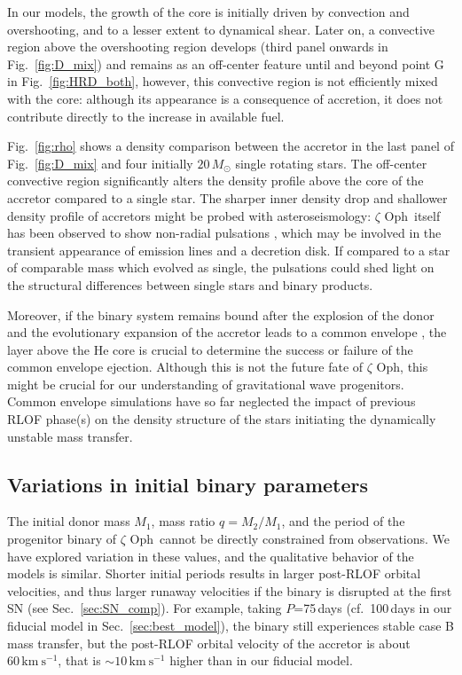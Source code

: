 \documentclass[twocolumn,twocolappendix,trackchanges]{aastex63}
\newcommand{\kms}{{\mathrm{km\ s^{-1}}}}
\DeclareRobustCommand{\Figref}[1]{Fig.~\ref{#1}}
\DeclareRobustCommand{\Secref}[1]{Sec.~\ref{#1}}
\newcommand{\zoph}{$\zeta$ Oph}
\begin{document}
In our models, the growth of the core is initially driven by
convection and overshooting, and to a lesser extent to dynamical
shear. Later on, a convective region above the overshooting region
develops (third panel onwards in \Figref{fig:D_mix}) and remains as an
off-center feature until and beyond point G in \Figref{fig:HRD_both},
however, this convective region is not efficiently mixed with the
core: although its appearance is a consequence of accretion, it does
not contribute directly to the increase in available fuel.

\Figref{fig:rho} shows a density comparison between the accretor in
the last panel of \Figref{fig:D_mix} and four initially $20\,M_\odot$
single rotating stars. The off-center convective region significantly
alters the density profile above the core of the accretor compared to
a single star. The sharper inner density drop and shallower density
profile of accretors might be probed with asteroseismology: \zoph\
itself has been observed to show non-radial pulsations
\citep{walker:05}, which may be involved in the transient appearance of
emission lines and a decretion disk. If compared to a star of comparable mass which
evolved as single, the pulsations could shed light on the structural
differences between single stars and binary products.

Moreover, if the binary system remains bound after the explosion of
the donor and the evolutionary expansion of the accretor leads
to a common envelope \citep[e.g.,][]{paczynski:76}, the layer above
the He core is crucial to determine the success or failure of the
common envelope ejection. Although this is not the future fate of
\zoph, this might be crucial for our understanding of gravitational
wave progenitors.  Common envelope simulations have so far
neglected the impact of previous RLOF phase(s) on the density
structure of the stars initiating the dynamically unstable mass
transfer.

\subsection{Variations in initial binary parameters}
\label{sec:bin_init}

The initial donor mass $M_1$, mass ratio $q=M_2/M_1$, and the period
of the progenitor binary of \zoph\ cannot be directly constrained from
observations. We have explored variation in these values, and the
qualitative behavior of the models is similar.
Shorter initial periods results in larger post-RLOF orbital
velocities, and thus larger runaway velocities if the binary is
disrupted at the first SN (see \Secref{sec:SN_comp}). For example, taking $P$=75\,days
(cf.\ 100\,days in our fiducial model in \Secref{sec:best_model}), the
binary still experiences stable case B mass transfer, but the
post-RLOF orbital velocity of the accretor is about $60\,\kms$, that
is $\sim$$10\,\kms$ higher
than in our fiducial model.
\end{document}
